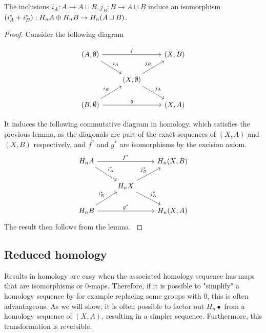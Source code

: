 \begin{prop}\label{disjoint-union}
The inclusions $i_A:A\rightarrow A\sqcup B,j_B:B\rightarrow A\sqcup B$ induce an isomorphism $(i_A^*+i_B^*):H_n A\oplus H_n B \rightarrow H_n(A\sqcup B)$.
\end{prop}
\begin{proof}
Consider the following diagram

\[\begin{tikzcd}
{(A,\emptyset)} \arrow[rd, "i_A"] \arrow[rr, "f"] &                                                     & {(X,B)} \\
                                                  & {(X,\emptyset)} \arrow[ru, "j_B"] \arrow[rd, "j_A"] &         \\
{(B,\emptyset)} \arrow[ru, "i_B"] \arrow[rr, "g"] &                                                     & {(X,A)}
\end{tikzcd}\]

It induces the following commutative diagram in homology, which satisfies the previous lemma, as the diagonals are part of the exact sequences of $(X,A)$ and $(X,B)$ respectively, and $f^*$ and $g^*$ are isomorphisms by the excision axiom.
\[\begin{tikzcd}
H_nA \arrow[rd, "i_A^*"] \arrow[rr, "f^*"] &                                              & {H_n(X,B)} \\
                                           & H_nX \arrow[ru, "j_B^*"] \arrow[rd, "j_A^*"] &            \\
H_nB \arrow[ru, "i_B^*"] \arrow[rr, "g^*"] &                                              & {H_n(X,A)}
\end{tikzcd}\]
The result then follows from the lemma.
\cite{Werndli}
\end{proof}


\subsection{Reduced homology}
Results in homology are easy when the associated homology sequence has maps that are isomorphisms or $0$-maps. Therefore, if it is possible to "simplify" a homology sequence by for example replacing some groups with $0$, this is often advantageous. As we will show, it is often possible to factor out $H_n\bullet$ from a homology sequence of $(X,A)$, resulting in a simpler sequence. Furthermore, this transformation is reversible.

